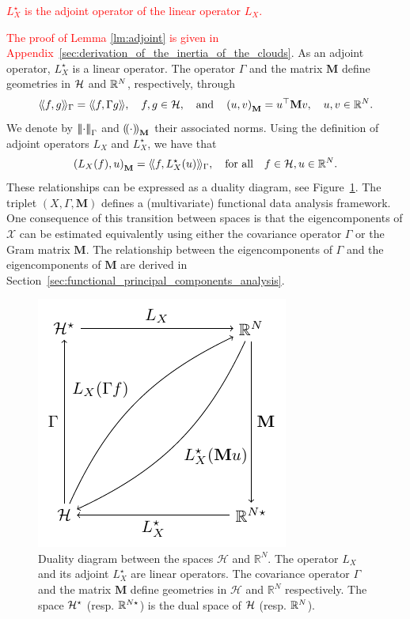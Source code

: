 \textcolor{red}{\begin{lemma}\label{lm:adjoint}
    $L^\star_X$ is the adjoint operator of the linear operator $L_X$.
\end{lemma}}
\textcolor{red}{The proof of Lemma \ref{lm:adjoint} is given in Appendix~\ref{sec:derivation_of_the_inertia_of_the_clouds}}. As an adjoint operator, $L^\star_X$ is a linear operator. The operator $\Gamma$ and the matrix $\mathbf{M}$ define geometries in $\mathcal{H}$ and $\mathbb{R}^N$, respectively, through
\begin{equation}
\langle\!\langle f, g\rangle\!\rangle_\Gamma = \langle\!\langle f, \Gamma g\rangle\!\rangle,\quad f, g \in \mathcal{H}, \quad\text{and}\quad \left(u, v\right)_{\mathbf{M}} = u^\top \mathbf{M} v,\quad u, v \in \mathbb{R}^N.
\end{equation}
We denote by $\left|\!\left|\!\left|\cdot\right|\!\right|\!\right|_\Gamma$ and $\left(\!\left(\cdot\right)\!\right)_{\mathbf{M}}$ their associated norms.
Using the definition of adjoint operators $L_X$ and $L^\star_X$, we have that
\begin{equation}
    \left(L_X(f), u\right)_{\mathbf{M}} = \langle\!\langle f, L^\star_X(u)\rangle\!\rangle_\Gamma, \quad\text{for all}\quad f \in \mathcal{H}, u \in \mathbb{R}^N.
\end{equation}
These relationships can be expressed as a duality diagram, see Figure~\ref{fig:duality_diagram}. The triplet $(X, \Gamma, \mathbf{M})$ defines a (multivariate) functional data analysis framework. One consequence of this transition between spaces is that the eigencomponents of $\mathcal{X}$ can be estimated equivalently using either the covariance operator $\Gamma$ or the Gram matrix $\mathbf{M}$. The relationship between the eigencomponents of $\Gamma$ and the eigencomponents of $\mathbf{M}$ are derived in Section~\ref{sec:functional_principal_components_analysis}.
\begin{figure}
    \centering
    \includegraphics[scale=1.2]{figures/duality_diagram.pdf}
    \caption{Duality diagram between the spaces $\mathcal{H}$ and $\mathbb{R}^N$. The operator $L_X$ and its adjoint $L^\star_X$ are linear operators. The covariance operator $\Gamma$ and the matrix $\mathbf{M}$ define geometries in $\mathcal{H}$ and $\mathbb{R}^N$ respectively. The space $\mathcal{H}^\star$ (resp. $\mathbb{R}^{N \star}$) is the dual space of $\mathcal{H}$ (resp. $\mathbb{R}^N$).}
    \label{fig:duality_diagram}
\end{figure}

